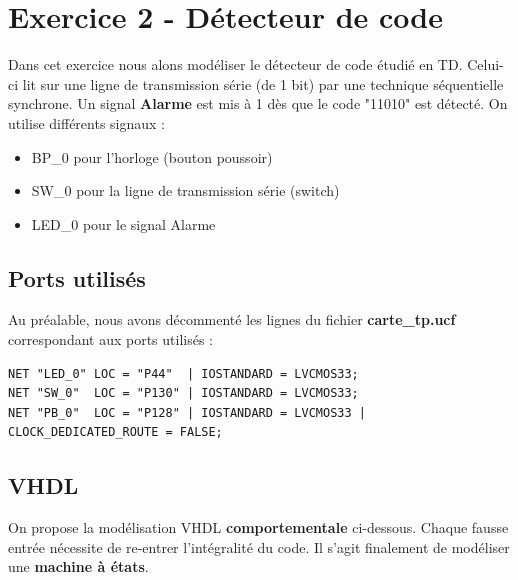 \section{Exercice 2 - Détecteur de code}
\label{ex2}

Dans cet exercice nous alons modéliser le détecteur de code étudié en TD. Celui-ci lit sur une ligne de transmission série (de 1 bit) par une technique séquentielle synchrone. Un signal \textbf{Alarme} est mis à 1 dès que le code "11010" est détecté. On utilise différents signaux :
\begin{itemize}
\item BP\_0 pour l’horloge (bouton poussoir)
\item SW\_0 pour la ligne de transmission série (switch)
\item LED\_0 pour le signal Alarme
\end{itemize}

\subsection{Ports utilisés}

Au préalable, nous avons décommenté les lignes du fichier \textbf{carte\_tp.ucf} correspondant aux ports utilisés :
\begin{lstlisting}
NET "LED_0" LOC = "P44"  | IOSTANDARD = LVCMOS33;
NET "SW_0"  LOC = "P130" | IOSTANDARD = LVCMOS33;
NET "PB_0"  LOC = "P128" | IOSTANDARD = LVCMOS33 | CLOCK_DEDICATED_ROUTE = FALSE;
\end{lstlisting}

\subsection{VHDL}

On propose la modélisation VHDL \textbf{comportementale} ci-dessous. Chaque fausse entrée nécessite de re-entrer l'intégralité du code. Il s'agit finalement de modéliser une \textbf{machine à états}.


